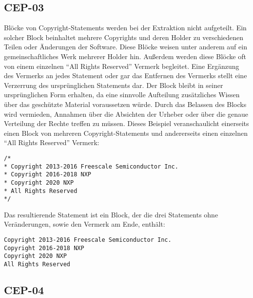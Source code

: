 
\subsection{CEP-03}\label{subsec:cep-03}

Blöcke von Copyright-Statements werden bei der Extraktion nicht aufgeteilt.
Ein solcher Block beinhaltet mehrere Copyrights und deren Holder zu verschiedenen Teilen oder Änderungen der Software.
Diese Blöcke weisen unter anderem auf ein gemeinschaftliches Werk mehrerer Holder hin.
Außerdem werden diese Blöcke oft von einem einzelnen \enquote{All Rights Reserved} Vermerk begleitet.
Eine Ergänzung des Vermerks an jedes Statement oder gar das Entfernen des Vermerks stellt eine Verzerrung des ursprünglichen Statements dar.
Der Block bleibt in seiner ursprünglichen Form erhalten, da eine sinnvolle Aufteilung zusätzliches Wissen über das geschützte Material voraussetzen würde.
Durch das Belassen des Blocks wird vermieden, Annahmen über die Absichten der Urheber oder über die genaue Verteilung der Rechte treffen zu müssen.
Dieses Beispiel veranschaulicht einerseits einen Block von mehreren Copyright-Statements und andererseits einen einzelnen \enquote{All Rights Reserved} Vermerk:

\begin{lstlisting}[numbers=none, keepspaces=true]
/*
* Copyright 2013-2016 Freescale Semiconductor Inc.
* Copyright 2016-2018 NXP
* Copyright 2020 NXP
* All Rights Reserved
*/
\end{lstlisting}

Das resultierende Statement ist ein Block, der die drei Statements ohne Veränderungen, sowie den Vermerk am Ende, enthält:

\begin{lstlisting}[numbers=none, keepspaces=true]
Copyright 2013-2016 Freescale Semiconductor Inc.
Copyright 2016-2018 NXP
Copyright 2020 NXP
All Rights Reserved
\end{lstlisting}


\subsection{CEP-04}\label{subsec:cep-04}

